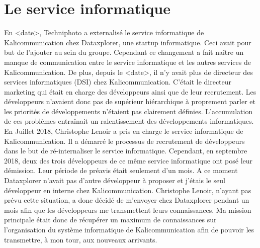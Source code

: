 \section{Le service informatique}
En <date>, Techniphoto a externalisé le service informatique de Kalicommunication chez Dataxplorer, une startup informatique. Ceci avait pour but de l'ajouter au sein du groupe. Cependant ce changement a fait naître un manque de communication entre le service informatique et les autres services de Kalicommunication.\newline
De plus, depuis le <date>, il n'y avait plus de directeur des services informatiques (DSI) chez Kalicommunication. C'était le directeur marketing qui était en charge des développeurs ainsi que de leur recrutement. Les développeurs n'avaient donc pas de supérieur hiérarchique à proprement parler et les priorités de développements n'étaient pas clairement définies. L'accumulation de ces problèmes entraînait un ralentissement des développements informatiques.\newline
En Juillet 2018, Christophe Lenoir a pris en charge le service informatique de Kalicommunication. Il a démarré le processus de recrutement de développeurs dans le but de ré-internaliser le service informatique.\newline
Cependant, en septembre 2018, deux des trois développeurs de ce même service informatique ont posé leur démission. Leur période de préavis était seulement d'un mois. A ce moment Dataxplorer n'avait pas d'autre développeur à proposer et j'étais le seul développeur en interne chez Kalicommunication. Christophe Lenoir, n'ayant pas prévu cette situation, a donc décidé de m'envoyer chez Dataxplorer pendant un mois afin que les développeurs me transmettent leurs connaissances.\newline
Ma mission principale était donc de récupérer un maximum de connaissances sur l'organisation du système informatique de Kalicommunication afin de pouvoir les transmettre, à mon tour, aux nouveaux arrivants.